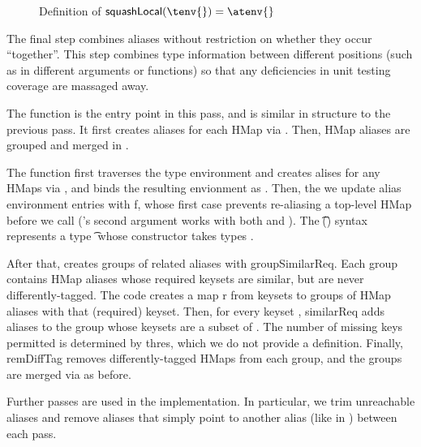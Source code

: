 \begin{figure*}
\begin{mathpar}
\end{mathpar}
\caption{Definition of $\squashlocal{}(\tenv{}) = \atenv{}$
  }
  \label{infer:fig:squashlocal}
\end{figure*}


The final step combines aliases
without restriction on whether they occur ``together''.
This step combines type information between different positions
(such as in different arguments or functions) so that any deficiencies
in unit testing coverage are massaged away.

The \squashglobal{} function is the entry point in this pass,
and is similar in structure to the previous pass.
It first creates aliases for each HMap via \aliassinglehmap{}.
Then, HMap aliases are grouped and merged in \squashhorizonally{}.

The \aliassinglehmap{} function first traverses the type environment
and creates alises for any HMaps via \singlehmap{}, and binds the resulting
envionment as \atenvp{}.
Then, the we update alias environment entries with \textsf{f}, whose first
case prevents re-aliasing a top-level HMap before we call \singlehmap{}
(\singlehmap{}'s second argument works with both \x{} and \alias{}).
The \t{}(\ova{\s{}}) syntax represents a type \t{} whose constructor
takes types \ova{\s{}}.

After that, \squashhorizonally{} creates groups of related
aliases with \textsf{groupSimilarReq}.
Each group contains HMap aliases whose required keysets are similar,
but are never differently-tagged.
The code creates a map \textsf{r} from keysets to groups of HMap
aliases with that (required) keyset.
Then, for every keyset \ova{\kw{}}, \textsf{similarReq} adds aliases to the group
whose keysets are a subset of \ova{\kw{}}. The number of missing
keys permitted is determined by \textsf{thres}, which we do not provide a
definition.
Finally, \textsf{remDiffTag} removes differently-tagged HMaps from each group,
and the groups are merged via \mergealiases{} as before.


Further passes are used in the implementation.
In particular, we trim unreachable aliases and remove aliases
that simply point to another alias (like  in \mergealiases{})
between each pass.


